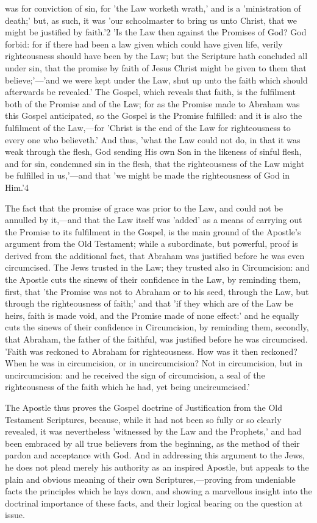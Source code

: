 \documentclass[
]{book}
\begin{document}
was for conviction of sin, for 'the Law worketh wrath,' and is a 'ministration of death;' but, as such, it was 'our schoolmaster to bring us unto Christ, that we might be justified by faith.'2 'Is the Law then against the Promises of God? God forbid: for if there had been a law given which could have given life, verily righteousness should have been by the Law; but the Scripture hath concluded all under sin, that the promise by faith of Jesus Christ might be given to them that believe;'---'and we were kept under the Law, shut up unto the faith which should afterwards be revealed.' The Gospel, which reveals that faith, is the fulfilment both of the Promise and of the Law; for as the Promise made to Abraham was this Gospel anticipated, so the Gospel is the Promise fulfilled: and it is also the fulfilment of the Law,---for 'Christ is the end of the Law for righteousness to every one who believeth.' And thus, 'what the Law could not do, in that it was weak through the flesh, God sending His own Son in the likeness of sinful flesh, and for sin, condemned sin in the flesh, that the righteousness of the Law might be fulfilled in us,'---and that 'we might be made the righteousness of God in Him.'4

The fact that the promise of grace was prior to the Law, and could not be annulled by it,---and that the Law itself was 'added' as a means of carrying out the Promise to its fulfilment in the Gospel, is the main ground of the Apostle's argument from the Old Testament; while a subordinate, but powerful, proof is derived from the additional fact, that Abraham was justified before he was even circumcised. The Jews trusted in the Law; they trusted also in Circumcision: and the Apostle cuts the sinews of their confidence in the Law, by reminding them, first, that 'the Promise was not to Abraham or to his seed, through the Law, but through the righteousness of faith;' and that 'if they which are of the Law be heirs, faith is made void, and the Promise made of none effect:' and he equally cuts the sinews of their confidence in Circumcision, by reminding them, secondly, that Abraham, the father of the faithful, was justified before he was circumcised. 'Faith was reckoned to Abraham for righteousness. How was it then reckoned? When he was in circumcision, or in uncircumcision? Not in circumcision, but in uncircumcision: and he received the sign of circumcision, a seal of the righteousness of the faith which he had, yet being uncircumcised.'

The Apostle thus proves the Gospel doctrine of Justification from the Old Testament Scriptures, because, while it had not been so fully or so clearly revealed, it was nevertheless 'witnessed by the Law and the Prophets,' and had been embraced by all true believers from the beginning, as the method of their pardon and acceptance with God. And in addressing this argument to the Jews, he does not plead merely his authority as an inspired Apostle, but appeals to the plain and obvious meaning of their own Scriptures,---proving from undeniable facts the principles which he lays down, and showing a marvellous insight into the doctrinal importance of these facts, and their logical bearing on the question at issue.
\end{document}
